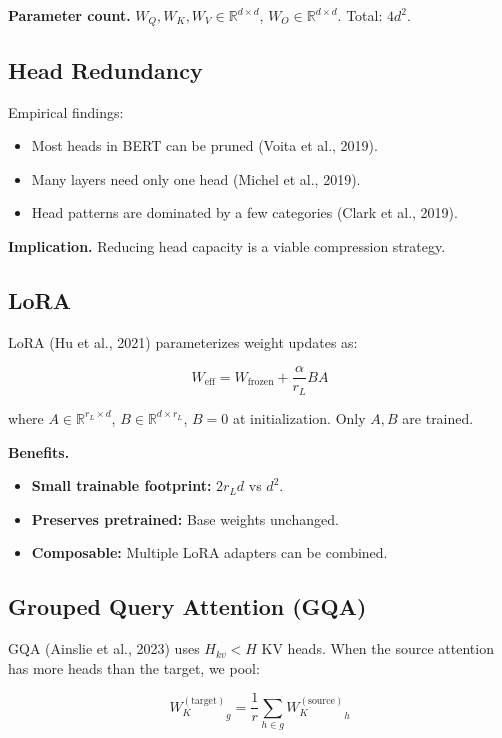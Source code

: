 \textbf{Parameter count.} $W_Q, W_K, W_V \in \mathbb{R}^{d \times d}$, 
$W_O \in \mathbb{R}^{d \times d}$. Total: $4 d^2$.

\subsection{Head Redundancy}

Empirical findings:

\begin{itemize}
\item Most heads in BERT can be pruned (Voita et al., 2019).
\item Many layers need only one head (Michel et al., 2019).
\item Head patterns are dominated by a few categories (Clark et al., 2019).

\end{itemize}
\textbf{Implication.} Reducing head capacity is a viable compression strategy.

\subsection{LoRA}

LoRA (Hu et al., 2021) parameterizes weight updates as:

\[
W_\text{eff} = W_\text{frozen} + \frac{\alpha}{r_L} B A
\]

where $A \in \mathbb{R}^{r_L \times d}$, $B \in \mathbb{R}^{d \times r_L}$, 
$B = 0$ at initialization. Only $A, B$ are trained.

\textbf{Benefits.}
\begin{itemize}
\item \textbf{Small trainable footprint:} $2 r_L d$ vs $d^2$.
\item \textbf{Preserves pretrained:} Base weights unchanged.
\item \textbf{Composable:} Multiple LoRA adapters can be combined.

\end{itemize}
\subsection{Grouped Query Attention (GQA)}

GQA (Ainslie et al., 2023) uses $H_{kv} < H$ KV heads. When the source 
attention has more heads than the target, we pool:

\[
{W_K^{(\text{target})}}_g = \frac{1}{r} \sum_{h \in g} {W_K^{(\text{source})}}_h
\]

